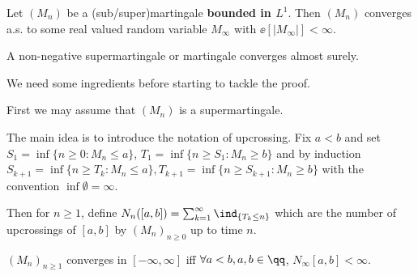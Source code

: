 \documentclass[../main.tex]{subfiles}
\begin{document}
\begin{theorem}
  [Doob]
  Let $(M_n)$ be a (sub/super)martingale \textbf{bounded in $L^1$}. Then $(M_n)$
  converges a.s. to some real valued random variable $M_{\infty}$ with
  $\ee[|M_{\infty}|] < \infty$.
\end{theorem}
\begin{corollary}
    A non-negative supermartingale or martingale converges almost surely.
\end{corollary}

We need some ingredients before starting to tackle the proof. 

First we may assume that $(M_n)$ is a supermartingale.

The main idea is to introduce the notation of upcrossing. Fix $a < b$ and set 
$S_1 = \inf \{ n \geq 0 \colon M_n \leq a \} $, $T_1 = \inf \{ n \geq S_1 \colon
M_n \geq b\} $ and by induction $S_{k+1} = \inf \{ n \geq T_k \colon M_n \leq a
\}, T_{k+1} = \inf \{ n \geq S_{k+1} \colon M_n \geq b \} $ with the convention
$\inf \emptyset = \infty$. 

Then for $n \geq 1$, define $N_n([a, b]) = \sum_{k=1}^\infty \ind_{\{ T_k \leq n \} } $
which are the number of upcrossings of $[a, b]$ by $(M_n)_{n \geq 0}$ up to time
$n$.

\begin{lemma}
  $(M_n)_{n \geq 1}$ converges in $[-\infty, \infty]$ iff $\forall a < b, a, b
  \in \qq$, $N_{\infty}[a, b] < \infty$.
\end{lemma}
\end{document}
